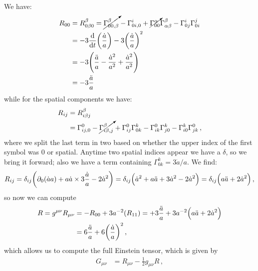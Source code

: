 \documentclass[main.tex]{subfiles}
\begin{document}
We have:
\begin{subequations}
\begin{align}
  R_{0 0 } &= R^{\beta }_{0 \beta 0 } 
  = \cancelto{}{\Gamma^{\beta }_{0 0  , \beta } }
  - \Gamma^{i }_{0 i , 0 } 
  + \cancelto{}{\Gamma^{\alpha }_{0 0 }} \Gamma^{\beta }_{\alpha \beta } 
  - \Gamma^{i }_{0 j } \Gamma^{j }_{0 i }  \\
  &= -3 \dv{}{t} \qty(\frac{\dot{a}}{a}) - 3 \qty(\frac{\dot{a}}{a})^2  \\
  &= -3 \qty(\frac{\ddot{a}}{a} - \frac{\dot{a}^2}{a^2} + \frac{\dot{a}^2}{a^2})  \\
  &= - 3 \frac{\ddot{a}}{a}
  \,
\end{align}
\end{subequations}
%
while for the spatial components we have: 
%
\begin{subequations}
\begin{align}
R_{ij} &= R^{\beta }_{i \beta j}  \\
&= \Gamma^{0 }_{i j  , 0 } 
- \cancelto{}{\Gamma^{\beta }_{i \beta , j }} 
+ \Gamma^{0 }_{i j } \Gamma^{k }_{0 k } 
- \Gamma^{0 }_{i k } \Gamma^{k }_{j 0 }
- \Gamma^{k }_{i 0 } \Gamma^{0 }_{j k }
\,,
\end{align}
\end{subequations}
%
where we split the last term in two based on whether the upper index of the first symbol was 0 or spatial. 
Anytime two spatial indices appear we have a \(\delta \), so we bring it forward; also we have a term containing \(\Gamma^{k}_{0k} = 3 \dot{a} / a \). We find: 
%
\begin{align}
R_{ij} = \delta_{ij} \qty(\partial_{0}\qty(
  \dot{a} a 
) 
+ a \dot{a} \times 3 \frac{\dot{a}}{a}
- 2 \dot{a}^2)
= \delta_{ij} \qty(\dot{a}^2 + a \ddot{a} + 3 \dot{a}^2 - 2 \dot{a}^2 )  
= \delta_{ij} \qty( a \ddot{a} +2 \dot{a}^2)
\,,
\end{align}
%
so now we can compute 
%
\begin{subequations}
\begin{align}
R = g^{\mu \nu } R_{\mu \nu } &= - R_{00} + 3 a^{-2} \qty(R_{11} ) = + 3 \frac{\ddot{a}}{a} + 3 a^{-2} \qty(a \ddot{a} + 2 \dot{a}^2) \\
&= 6 \frac{\ddot{a}}{a} + 6 \qty(\frac{\dot{a}}{a})^2
\,,
\end{align}
\end{subequations}
%
which allows us to compute the full Einstein tensor, which is given by 
%
\begin{align}
G_{\mu \nu } &= R_{\mu \nu }- \frac{1}{2} g_{\mu \nu }  R  
\,,
\end{align}
\end{document}
